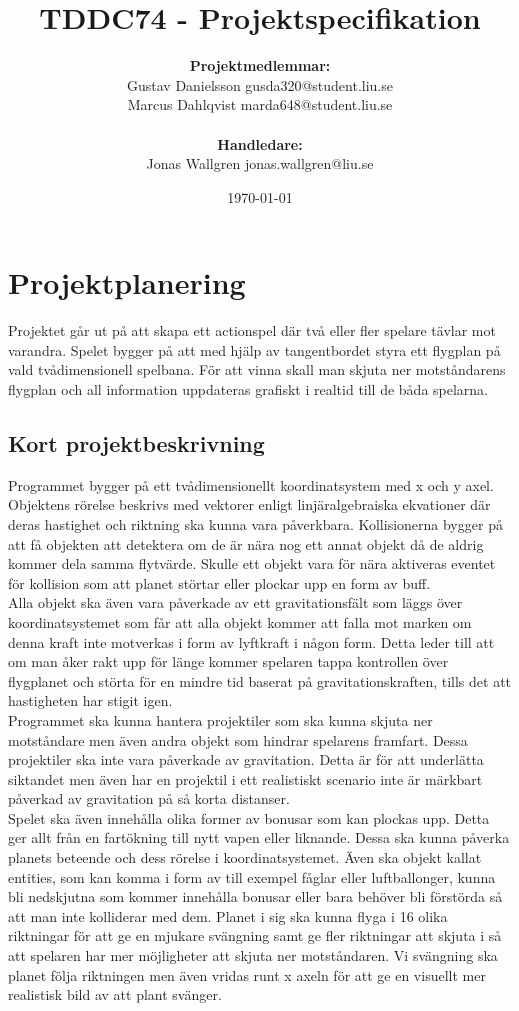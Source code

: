 \documentclass[12pt,a4paper]{article}
\title{TDDC74 -  Projektspecifikation}
\author{\textbf{Projektmedlemmar:}\\
Gustav Danielsson \small{gusda320@student.liu.se}\\
Marcus Dahlqvist \small{marda648@student.liu.se}\\ 
\bigskip\\ \textbf{Handledare:}\\
Jonas Wallgren {\small jonas.wallgren@liu.se}}
\date{\today}
\begin{document}
\maketitle
\newpage

\tableofcontents
\newpage

\section{Projektplanering}
Projektet går ut på att skapa ett actionspel där två eller fler spelare tävlar mot varandra. Spelet bygger på att med hjälp av tangentbordet styra ett flygplan på vald tvådimensionell spelbana. För att vinna skall man skjuta ner motståndarens flygplan och all information uppdateras grafiskt i realtid till de båda spelarna.

\subsection{Kort projektbeskrivning}
Programmet bygger på ett tvådimensionellt koordinatsystem med x och y axel. Objektens rörelse beskrivs med vektorer enligt linjäralgebraiska ekvationer där deras hastighet och riktning ska kunna vara påverkbara. Kollisionerna bygger på att få objekten att detektera om de är nära nog ett annat objekt då de aldrig kommer dela samma flytvärde. Skulle ett objekt vara för nära aktiveras eventet för kollision som att planet störtar eller plockar upp en form av buff. \\

Alla objekt ska även vara påverkade av ett gravitationsfält som läggs över koordinatsystemet som får att alla objekt kommer att falla mot marken om denna kraft inte motverkas i form av lyftkraft i någon form. Detta leder till att om man åker rakt upp för länge kommer spelaren tappa kontrollen över flygplanet och störta för en mindre tid baserat på gravitationskraften, tills det att hastigheten har stigit igen. \\

Programmet ska kunna hantera projektiler som ska kunna skjuta ner motståndare men även andra objekt som hindrar spelarens framfart. Dessa projektiler ska inte vara påverkade av gravitation. Detta är för att underlätta siktandet men även har en projektil i ett realistiskt scenario inte är märkbart påverkad av gravitation på så korta distanser. \\

Spelet ska även innehålla olika former av bonusar som kan plockas upp. Detta ger allt från en fartökning till nytt vapen eller liknande. Dessa ska kunna påverka planets beteende och dess rörelse i koordinatsystemet.  Även ska objekt kallat entities, som kan komma i form av till exempel fåglar eller luftballonger, kunna bli nedskjutna som kommer innehålla bonusar eller bara behöver bli förstörda så att man inte kolliderar med dem. 
Planet i sig ska kunna flyga i 16 olika riktningar för att ge en mjukare svängning samt ge fler riktningar att skjuta i så att spelaren har mer möjligheter att skjuta ner motståndaren. Vi svängning ska planet följa riktningen men även vridas runt x axeln för att ge en visuellt mer realistisk bild av att plant svänger. \\
\end{document}
